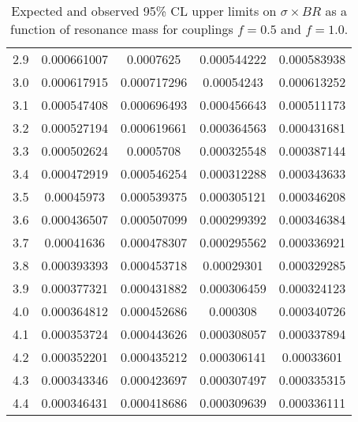 \begin{table}[h!]
\begin{center}
\begin{tabular}{|c||c|c||c|c|}
2.9 & 0.000661007 &  0.0007625 & 0.000544222 &  0.000583938 \\
3.0 & 0.000617915 &  0.000717296 & 0.00054243 &  0.000613252 \\
3.1 & 0.000547408 &  0.000696493 & 0.000456643 &  0.000511173 \\
3.2 & 0.000527194 &  0.000619661 & 0.000364563 &  0.000431681 \\
3.3 & 0.000502624 &  0.0005708 & 0.000325548 &  0.000387144 \\
3.4 & 0.000472919 &  0.000546254 & 0.000312288 &  0.000343633 \\
3.5 & 0.00045973 &  0.000539375 & 0.000305121 &  0.000346208 \\
3.6 & 0.000436507 &  0.000507099 & 0.000299392 &  0.000346384 \\
3.7 & 0.00041636 &  0.000478307 & 0.000295562 &  0.000336921 \\
3.8 & 0.000393393 &  0.000453718 & 0.00029301 &  0.000329285 \\
3.9 & 0.000377321 &  0.000431882 & 0.000306459 &  0.000324123 \\
4.0 & 0.000364812 &  0.000452686 & 0.000308 &  0.000340726 \\
4.1 & 0.000353724 &  0.000443626 & 0.000308057 &  0.000337894 \\
4.2 & 0.000352201 &  0.000435212 & 0.000306141 &  0.00033601 \\
4.3 & 0.000343346 &  0.000423697 & 0.000307497 &  0.000335315 \\
4.4 & 0.000346431 &  0.000418686 & 0.000309639 &  0.000336111 \\
\hline
\end{tabular}
\caption{Expected and observed 95\% CL upper limits on $\sigma\times BR$ as a function of resonance mass for couplings $f=0.5$ and $f=1.0$.}
   \label{Table:ObsLimits}
\end{center}
\end{table}
